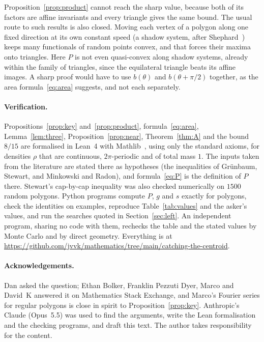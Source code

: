 \documentclass[11pt]{article}
\theoremstyle{remark}
\begin{document}
Proposition~\ref{prop:product} cannot reach the sharp value, because both of its factors are affine
invariants and every triangle gives the same bound. The usual route to such results is also closed.
Moving each vertex of a polygon along one fixed direction at its own constant speed (a shadow system,
after Shephard~\cite{She64}) keeps many functionals of random points convex, and that
forces their maxima onto triangles. Here $P$ is not even quasi-convex along shadow systems, already
within the family of triangles, since the equilateral triangle beats its affine images. A sharp proof
would have to use $b(\theta)$ and $b(\theta+\pi/2)$ together, as the area formula~\eqref{eq:area}
suggests, and not each separately.

\paragraph{Verification.} Propositions~\ref{prop:key} and~\ref{prop:product}, formula~\eqref{eq:area},
Lemma~\ref{lem:three}, Proposition~\ref{prop:near}, Theorem~\ref{thm:A} and the bound $8/15$ are
formalised in Lean~4 with Mathlib~\cite{mathlib}, using only the standard axioms, for densities $\rho$
that are continuous, $2\pi$-periodic and of total mass $1$. The inputs taken from the literature are
stated there as hypotheses (the inequalities of Gr\"unbaum, Stewart, and Minkowski and Radon), and
formula~\eqref{eq:P} is the definition of $P$ there. Stewart's cap-by-cap inequality was also checked
numerically on $1500$ random polygons. Python programs compute $P$, $g$ and $s$ exactly for polygons, check the
identities on examples, reproduce Table~\ref{tab:values} and the asker's values, and run the searches
quoted in Section~\ref{sec:left}. An independent program, sharing no code with them, rechecks the
table and the stated values by Monte Carlo and by direct geometry. Everything is at
\url{https://github.com/jvvk/mathematics/tree/main/catching-the-centroid}.

\paragraph{Acknowledgements.} Dan asked the question; Ethan Bolker, Franklin Pezzuti Dyer, Marco and
David~K answered it on Mathematics Stack Exchange, and Marco's Fourier series for regular polygons is
close in spirit to Proposition~\ref{prop:key}. Anthropic's Claude (Opus~5.5) was used to find the
arguments, write the Lean formalisation and the checking programs, and draft this text. The author
takes responsibility for the content.
\end{document}

